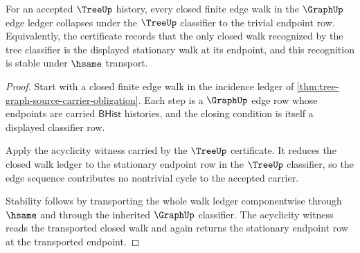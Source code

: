 \begin{theorem}
\label{thm:tree-acyclicity-obligation}
For an accepted $\TreeUp$ history, every closed finite edge walk in the
$\GraphUp$ edge ledger collapses under the $\TreeUp$ classifier to the
trivial endpoint row. Equivalently, the certificate records that the only
closed walk recognized by the tree classifier is the displayed stationary
walk at its endpoint, and this recognition is stable under $\hsame$ transport.
\end{theorem}
\begin{proof}
Start with a closed finite edge walk in the incidence ledger of
\autoref{thm:tree-graph-source-carrier-obligation}. Each step is a
$\GraphUp$ edge row whose endpoints are carried $\mathsf{BHist}$ histories,
and the closing condition is itself a displayed classifier row.

Apply the acyclicity witness carried by the $\TreeUp$ certificate. It reduces
the closed walk ledger to the stationary endpoint row in the $\TreeUp$
classifier, so the edge sequence contributes no nontrivial cycle to the
accepted carrier.

Stability follows by transporting the whole walk ledger componentwise through
$\hsame$ and through the inherited $\GraphUp$ classifier. The acyclicity
witness reads the transported closed walk and again returns the stationary
endpoint row at the transported endpoint.
\end{proof}

